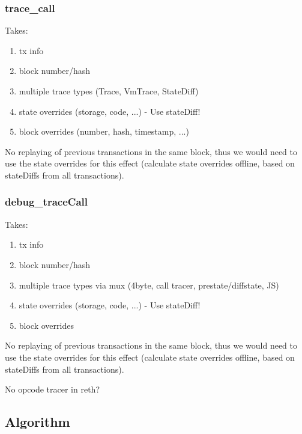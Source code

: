 \documentclass[draft,final]{vutinfth} %
\begin{document}

\subsubsection{trace\_call}


Takes:
\begin{enumerate}
    \item tx info
    \item block number/hash
    \item multiple trace types (Trace, VmTrace, StateDiff)
    \item state overrides (storage, code, ...) - Use stateDiff!
    \item block overrides (number, hash, timestamp, ...)
\end{enumerate}

No replaying of previous transactions in the same block, thus we would need to use the state overrides for this effect (calculate state overrides offline, based on stateDiffs from all transactions).

\subsubsection{debug\_traceCall}

Takes:
\begin{enumerate}
    \item tx info
    \item block number/hash
    \item multiple trace types via mux (4byte, call tracer, prestate/diffstate, JS)
    \item state overrides (storage, code, ...) - Use stateDiff!
    \item block overrides
\end{enumerate}

No replaying of previous transactions in the same block, thus we would need to use the state overrides for this effect (calculate state overrides offline, based on stateDiffs from all transactions).

No opcode tracer in reth?

\subsection{Algorithm}
\end{document}

